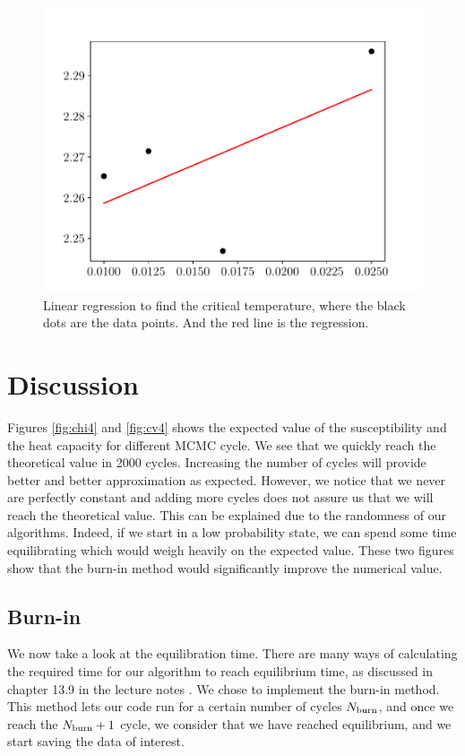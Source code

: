 \documentclass[english,notitlepage,reprint,nofootinbib]{revtex4-2}  %
\begin{document}
	\begin{figure}[h!]
	  \centering
	  \includegraphics[width=1.0\linewidth]{figures/prob9_lin.pdf}
	  \caption{Linear regression to find the critical temperature, where the black dots are the data points. And the red line is the regression.\label{fig:prob9_lin}}
	\end{figure}
	\section{Discussion}\label{sec:discussion}
	Figures \ref{fig:chi4} and \ref{fig:cv4} shows the expected value of the susceptibility
	and the heat capacity for different MCMC cycle. We see that we quickly reach the theoretical
	value in 2000 cycles. Increasing the number of cycles will provide better and better
	approximation as expected. However, we notice that we never are perfectly constant and adding
	more cycles does not assure us that we will reach the theoretical value. This
	can be explained due to the randomness of our algorithms. Indeed, if we start in a low probability state, we can spend some time equilibrating which would weigh heavily on the
	expected value. These two figures show that the burn-in method would significantly improve
	the numerical value.


	\subsection{Burn-in}\label{subsec:dis burnin}

	We now take a look at the equilibration time. There are many ways of calculating the required
	time for our algorithm to reach equilibrium time, as discussed in chapter 13.9 in the lecture notes \cite{Morten15}. We chose
	to implement the burn-in method. This method lets our code run for a certain number
	of cycles $N_{\rm burn}$, and once we reach the $N_{\rm burn} + 1$ cycle, we consider that we have reached equilibrium, and we start saving the data of interest.
\end{document}
